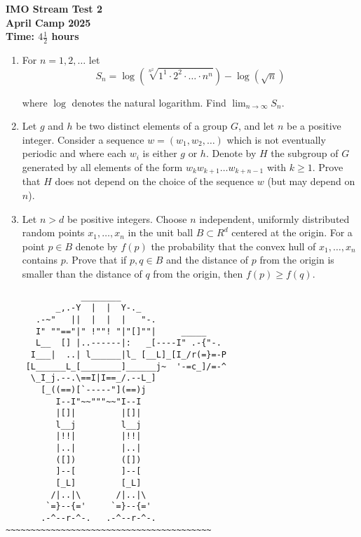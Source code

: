 \documentclass[12pt]{article}
\begin{document}
\thispagestyle{empty}

\begin{center}
  \textbf{\Large IMO Stream Test 2}
  \\ \vspace{1em}
  \textbf{\large April Camp 2025}
  \\ \vspace{1em}
  \textbf{\large Time: $4\frac{1}{2}$ hours}
\end{center}


\begin{enumerate}[leftmargin=0pt,topsep=2\bigskipamount,itemsep=\medskipamount]
\item For $n=1,2,\ldots$ let
\[
S_n=\log\left(\sqrt[n^2]{1^1\cdot 2^2\cdot\ldots\cdot n^n}\right)-\log\left(\sqrt{n}\right)
\]

where $\log$ denotes the natural logarithm. Find $\displaystyle \lim_{n\rightarrow\infty}S_n$.

\item Let $g$ and $h$ be two distinct elements of a group $G$, and let $n$ be a positive integer. Consider a sequence $w=(w_1,w_2,\ldots)$ which is not eventually periodic and where each $w_i$ is either $g$ or $h$. Denote by $H$ the subgroup of $G$ generated by all elements of the form $w_kw_{k+1}\ldots w_{k+n-1}$ with $k\geqslant1$. Prove that $H$ does not depend on the choice of the sequence $w$ (but may depend on $n$).

\item Let $n>d$ be positive integers. Choose $n$ independent, uniformly distributed random points $x_1,\ldots,x_n$ in the unit ball $B\subset R^d$ centered at the origin. For a point $p\in B$ denote by $f(p)$ the probability that the convex hull of $x_1,\ldots,x_n$ contains $p$. Prove that if $p,q\in B$ and the distance of $p$ from the origin is smaller than the distance of $q$ from the origin, then $f(p)\geqslant f(q)$.



\end{enumerate}


\vfill
\centering
\tiny %
\begin{BVerbatim}
               ________
          _,.-Y  |  |  Y-._
      .-~"   ||  |  |  |   "-.
      I" ""=="|" !""! "|"[]""|     _____
      L__  [] |..------|:   _[----I" .-{"-.
     I___|  ..| l______|l_ [__L]_[I_/r(=}=-P
    [L______L_[________]______j~  '-=c_]/=-^
     \_I_j.--.\==I|I==_/.--L_]
       [_((==)[`-----"](==)j
          I--I"~~"""~~"I--I
          |[]|         |[]|
          l__j         l__j
          |!!|         |!!|
          |..|         |..|
          ([])         ([])
          ]--[         ]--[
          [_L]         [_L]
         /|..|\       /|..|\
        `=}--{='     `=}--{='
       .-^--r-^-.   .-^--r-^-.
~~~~~~~~~~~~~~~~~~~~~~~~~~~~~~~~~~~~~~~~~
\end{BVerbatim}
\end{document}
